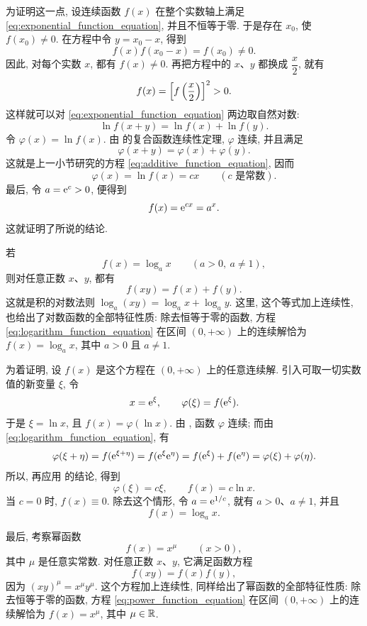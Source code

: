 为证明这一点, 设连续函数 $f(x)$ 在整个实数轴上满足
\eqref{eq:exponential_function_equation}, 并且不恒等于零.
于是存在 $x_0$, 使 $f(x_0)\neq0$.
在方程中令 $y=x_0-x$, 得到
$$
f(x)f(x_0-x)=f(x_0)\neq0.
$$
因此, 对每个实数 $x$, 都有 $f(x)\neq0$.
再把方程中的 $x$、$y$ 都换成 $\dfrac x2$, 就有
$$
f(x)=\left[ f\left( \frac x2 \right) \right]^2>0.
$$
这样就可以对 \eqref{eq:exponential_function_equation} 两边取自然对数:
$$
\ln f(x+y)=\ln f(x)+\ln f(y).
$$
令 $\varphi(x)=\ln f(x)$. 由  的复合函数连续性定理,
$\varphi$ 连续, 并且满足
$$
\varphi(x+y)=\varphi(x)+\varphi(y).
$$
这就是上一小节研究的方程 \eqref{eq:additive_function_equation}, 因而
$$
\varphi(x)=\ln f(x)=cx\qquad(c\text{ 是常数}).
$$
最后, 令 $a=\mathrm{e}^c>0$, 便得到
$$
f(x)=\mathrm{e}^{cx}=a^x.
$$
这就证明了所说的结论.

\myrefparagraph{2\textdegree}\label{ex:logarithm_functional_characterization}
若
\begin{equation}\label{eq:logarithm_function_form}
f(x)=\log_a x\qquad(a>0,\ a\neq1),
\tag{c}
\end{equation}
则对任意正数 $x$、$y$, 都有
\begin{equation}\label{eq:logarithm_function_equation}
f(xy)=f(x)+f(y).
\tag{C}
\end{equation}
这就是积的对数法则 $\log_a(xy)=\log_a x+\log_a y$.
这里, 这个等式加上连续性, 也给出了对数函数的全部特征性质:
{\kaishu 除去恒等于零的函数, 方程 \eqref{eq:logarithm_function_equation}
在区间 $(0,+\infty)$ 上的连续解恰为
$f(x)=\log_a x$, 其中 $a>0$ 且 $a\neq1$.}

为着证明, 设 $f(x)$ 是这个方程在 $(0,+\infty)$ 上的任意连续解.
引入可取一切实数值的新变量 $\xi$, 令
$$
x=\mathrm{e}^\xi,\qquad\varphi(\xi)=f(\mathrm{e}^\xi).
$$
于是 $\xi=\ln x$, 且 $f(x)=\varphi(\ln x)$.
由 , 函数 $\varphi$ 连续; 而由
\eqref{eq:logarithm_function_equation}, 有
$$
\varphi(\xi+\eta)
=f(\mathrm{e}^{\xi+\eta})=f(\mathrm{e}^\xi\mathrm{e}^\eta)
=f(\mathrm{e}^\xi)+f(\mathrm{e}^\eta)=\varphi(\xi)+\varphi(\eta).
$$
所以, 再应用  的结论, 得到
$$
\varphi(\xi)=c\xi,\qquad f(x)=c\ln x.
$$
当 $c=0$ 时, $f(x)\equiv0$.
除去这个情形, 令 $a=\mathrm{e}^{1/c}$, 就有 $a>0$、$a\neq1$, 并且
$$
f(x)=\log_a x.
$$

\myrefparagraph{3\textdegree}\label{ex:power_functional_characterization}
最后, 考察幂函数
\begin{equation}\label{eq:power_function_form}
f(x)=x^\mu\qquad(x>0),
\tag{d}
\end{equation}
其中 $\mu$ 是任意实常数.
对任意正数 $x$、$y$, 它满足函数方程
\begin{equation}\label{eq:power_function_equation}
f(xy)=f(x)f(y),
\tag{D}
\end{equation}
因为 $(xy)^\mu=x^\mu y^\mu$.
这个方程加上连续性, 同样给出了幂函数的全部特征性质:
{\kaishu 除去恒等于零的函数, 方程 \eqref{eq:power_function_equation}
在区间 $(0,+\infty)$ 上的连续解恰为 $f(x)=x^\mu$, 其中 $\mu\in\mathbb{R}$.}

